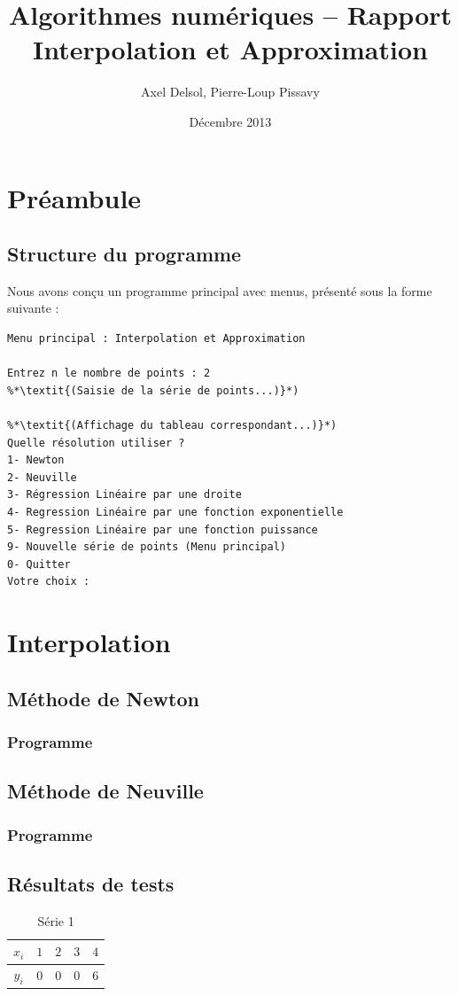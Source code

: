 \documentclass{report}
\title{Algorithmes numériques -- Rapport \\ \vspace{0.5cm}Interpolation et Approximation}
\author{Axel Delsol, Pierre-Loup Pissavy}
\date{Décembre 2013}
\begin{document}
  \maketitle
  \tableofcontents

  \chapter{Préambule}
    \section{Structure du programme}
    Nous avons conçu un programme principal avec menus, présenté sous la forme suivante :
    \begin{lstlisting}[style=apercu, name=Menu Principal]
Menu principal : Interpolation et Approximation

Entrez n le nombre de points : 2
%*\textit{(Saisie de la série de points...)}*)

%*\textit{(Affichage du tableau correspondant...)}*)
Quelle résolution utiliser ?
1- Newton
2- Neuville
3- Régression Linéaire par une droite
4- Regression Linéaire par une fonction exponentielle
5- Regression Linéaire par une fonction puissance
9- Nouvelle série de points (Menu principal)
0- Quitter
Votre choix :
    \end{lstlisting}
  \chapter{Interpolation}
    \section{Méthode de Newton}
      \subsection{Programme}
	
	\renewcommand{\arraystretch}{2}
	\renewcommand{\arraystretch}{1}
    \newpage
    \section{Méthode de Neuville}
      \subsection{Programme}
	
    \newpage
    \section{Résultats de tests}
      \begin{table}[h]
	\centering
	\begin{tabular}{| c | c | c | c | c |}
	\hline 
	$x_{i}$ & $1$ & $2$ & $3$ & $4$ \\ 
	\hline 
	$y_{i}$ & $0$ & $0$ & $0$ & $6$ \\ 
	\hline 
	\end{tabular}
	\caption{Série 1}
	\label{inter_td3_ex3}
      \end{table}
\end{document}

